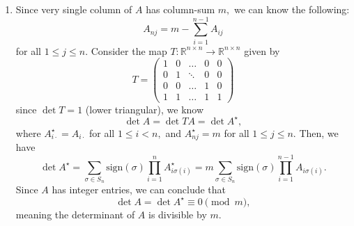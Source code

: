 \documentclass[12pt]{article}
\begin{document}
\begin{enumerate}
  \item[5] Since very single column of $A$ has column-sum $m,$ we can
    know the following: $$
    A_{nj} = m - \sum_{i = 1}^{n -1 } A_{ij}
    $$
    for all $1 \leq j \leq n.$ Consider the map $T : \mathbb R^{n
    \times n} \to \mathbb R^{n \times n}$  given by
    $$
    T =
    \begin{pmatrix}
      1 & 0 & \ldots & 0 & 0 \\
      0 & 1 & \ddots & 0 & 0 \\
      0 & 0 & \ldots & 1 & 0 \\
      1 & 1 & \ldots & 1 & 1
    \end{pmatrix}
    $$
    since $\det T = 1$ (lower triangular), we know $$
    \det A = \det TA = \det A^\star,
    $$
    where $A^\star_{i \cdot} = A_{i \cdot}$ for all $1 \leq i < n,$
    and $A^\star_{nj} = m$ for all $1 \leq j \leq n.$ Then, we have
    $$
    \det A^\star = \sum_{\sigma \in S_n} \text{sign}(\sigma) \prod_{i
    = 1}^{n} A^\star_{i \sigma(i)} = m \sum_{\sigma \in S_n}
    \text{sign}(\sigma) \prod_{i = 1 }^{n - 1} A_{i \sigma(i)}.
    $$
    Since $A$ has integer entries, we can conclude that $$
    \det A =\det A^\star \equiv 0 \pmod {m},
    $$
    meaning the determinant of $A$ is divisible by $m.$
\end{enumerate}
\end{document}
